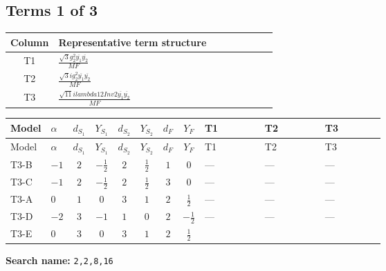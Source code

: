 \documentclass[8pt]{article}
\begin{document}
\begin{landscape}
\subsection*{Terms 1 of 3}
\begin{center}
\begin{tabular}{@{}c >{\raggedright\arraybackslash}p{0.82\linewidth}@{}}
\toprule
Column & Representative term structure \\
\midrule
T1 & \(\displaystyle \frac{\sqrt{3} g_{2}^{2} \overline{y_{1}} \overline{y_{2}}}{MF}\) \\
\midrule
T2 & \(\displaystyle \frac{\sqrt{3} i g_{2}^{2} \overline{y_{1}} \overline{y_{2}}}{MF}\) \\
\midrule
T3 & \(\displaystyle \frac{\sqrt{11} i lambda12Inv2 \overline{y_{1}} \overline{y_{2}}}{MF}\) \\
\midrule
\bottomrule
\end{tabular}
\end{center}
\smallskip
\tiny
\begin{longtable}{@{}llcccccc >{\raggedright\arraybackslash}p{0.21\linewidth} >{\raggedright\arraybackslash}p{0.21\linewidth} >{\raggedright\arraybackslash}p{0.21\linewidth}@{}}
\toprule
Model & $\alpha$ & $d_{S_1}$ & $Y_{S_1}$ & $d_{S_2}$ & $Y_{S_2}$ & $d_F$ & $Y_F$ & T1 & T2 & T3 \\
\midrule
\endfirsthead
\toprule
Model & $\alpha$ & $d_{S_1}$ & $Y_{S_1}$ & $d_{S_2}$ & $Y_{S_2}$ & $d_F$ & $Y_F$ & T1 & T2 & T3 \\
\midrule
\endhead
T3-B & $-1$ & $2$ & $-\frac{1}{2}$ & $2$ & $\frac{1}{2}$ & $1$ & $0$ & --- & --- & --- \\
\midrule
T3-C & $-1$ & $2$ & $-\frac{1}{2}$ & $2$ & $\frac{1}{2}$ & $3$ & $0$ & --- & --- & --- \\
\midrule
T3-A & $0$ & $1$ & $0$ & $3$ & $1$ & $2$ & $\frac{1}{2}$ & --- & --- & --- \\
\midrule
T3-D & $-2$ & $3$ & $-1$ & $1$ & $0$ & $2$ & $-\frac{1}{2}$ & --- & --- & --- \\
\midrule
T3-E & $0$ & $3$ & $0$ & $3$ & $1$ & $2$ & $\frac{1}{2}$ & \scriptsize\adjustbox{max width=\linewidth}{$\begin{gathered} \frac{\sqrt{3} g_{2}^{2} \overline{y_{1}} \overline{y_{2}}}{6 MF}\end{gathered}$} & \scriptsize\adjustbox{max width=\linewidth}{$\begin{gathered} - \frac{49 \sqrt{3} i g_{2}^{2} \overline{y_{1}} \overline{y_{2}}}{24 MF}\end{gathered}$} & \scriptsize\adjustbox{max width=\linewidth}{$\begin{gathered} - \frac{3 \sqrt{11} i lambda12Inv2 \overline{y_{1}} \overline{y_{2}}}{22 MF}\end{gathered}$} \\
\midrule
\bottomrule
\end{longtable}
\clearpage
\noindent\textbf{Search name: }\texttt{2,2,8,16}\par\smallskip

\end{landscape}
\end{document}
